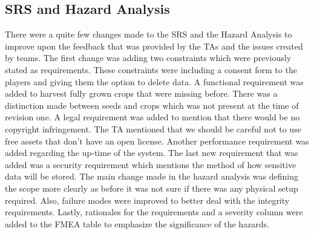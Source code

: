 \documentclass{article}
\begin{document}
\subsection{SRS and Hazard Analysis}
There were a quite few changes made to the SRS and the Hazard Analysis to improve upon the feedback that was provided by the TAs and the issues created by teams. The first change was adding two constraints which were previously stated as requirements. These constraints were including a consent form to the players and giving them the option to delete data. A functional requirement was added to harvest fully grown crops that were missing before. There was a distinction made between seeds and crops which was not present at the time of revision one. A legal requirement was added to mention that there would be no copyright infringement. The TA mentioned that we should be careful not to use free assets that don't have an open license. Another performance requirement was added regarding the up-time of the system. The last new requirement that was added was a security requirement which mentions the method of how sensitive data will be stored. The main change made in the hazard analysis was defining the scope more clearly as before it was not sure if there was any physical setup required. Also, failure modes were improved to better deal with the integrity requirements. Lastly, rationales for the requirements and a severity column were added to the FMEA table to emphasize the significance of the hazards. 
\end{document}
